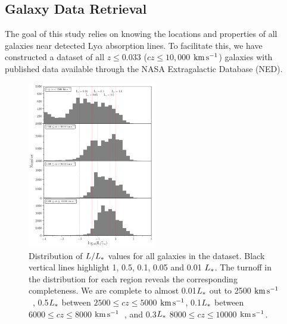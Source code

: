 \documentclass[iop]{emulateapj-rtx4}
\newcommand{\kms}{$\rm km\, s^{-1}$}
\begin{document}
\subsection{Galaxy Data Retrieval}

The goal of this study relies on knowing the locations and properties of all galaxies near detected Ly$\alpha$ absorption lines. To facilitate this, we have constructed a dataset of all $z\leq 0.033$ ($cz\leq 10,000$ \kms) galaxies with published data available through the NASA Extragalactic Database (NED). 

\begin{figure}[ht!]
        \centering
        \vspace{0pt}
        \includegraphics[width=0.50\textwidth]{fig1.pdf}
        \caption{\small{Distribution of $L/L_{\**}$ values for all galaxies in the dataset. Black vertical lines highlight 1, 0.5, 0.1, 0.05 and 0.01 $L_{\**}$. The turnoff in the distribution for each region reveals the corresponding completeness. We are complete to almost 			 0.01$L_{\**}$ out to 2500 \kms~, 0.5$L_{\**}$ between $2500 \leq cz \leq 5000$ \kms, 0.1$L_{\**}$ between $6000 \leq cz \leq 8000$ \kms~, and 0.3$L_{\**}$ $8000 \leq cz \leq 10000$ \kms.}}
        \vspace{5pt}
        \label{completeness}
\end{figure} 
\end{document}
